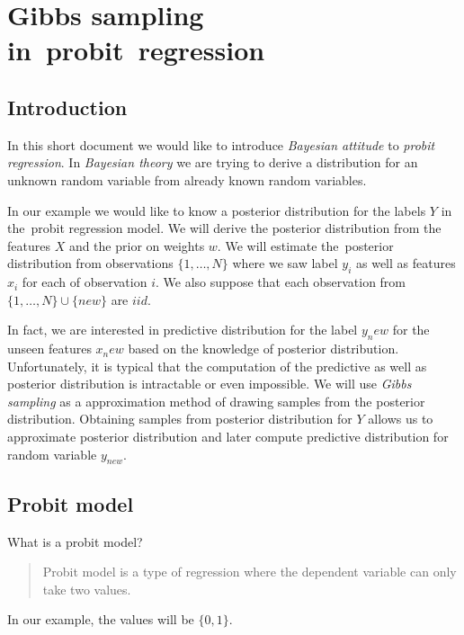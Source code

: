 
\maketitle  %

\chapter{Gibbs sampling in~probit~regression}
\label{cha:gibbs_sampling_for_probit_regression}


\section{Introduction} 
\label{sec:introduction}
In this short document we would like to introduce {\it Bayesian attitude} to {\it probit regression}. In {\it Bayesian theory} we are  trying to derive a distribution for an unknown random variable from already known random variables. 

In our example we would like to know a posterior distribution for the labels $Y$ in the~probit regression model. We will derive the posterior distribution from the features $X$ and the prior on weights $w$. We will estimate the~posterior distribution from observations $\{1,\ldots,N\}$ where we saw label $y_i$ as well as features $x_i$ for each of observation $i$. We also suppose that each observation from $\{1,\ldots,N\} \cup \{new\}$ are $iid$. 

In fact, we are interested in predictive distribution for the label $y_new$ for the unseen features $x_new$ based on the knowledge of posterior distribution. Unfortunately, it is typical that the computation of the predictive as well as posterior distribution is intractable or even impossible. We will use {\it Gibbs sampling} as a approximation method of drawing samples from the posterior distribution. Obtaining samples from posterior distribution for $Y$ allows us to approximate posterior distribution and later compute predictive distribution for random variable $y_{new}$.



\section{Probit model}
What is a probit model?
\begin{quotation}
    Probit model is a type of regression where the dependent variable can only take two values.
\end{quotation}\cite{wiki_probit}
In our example, the values will be $\{0,1\}$.

